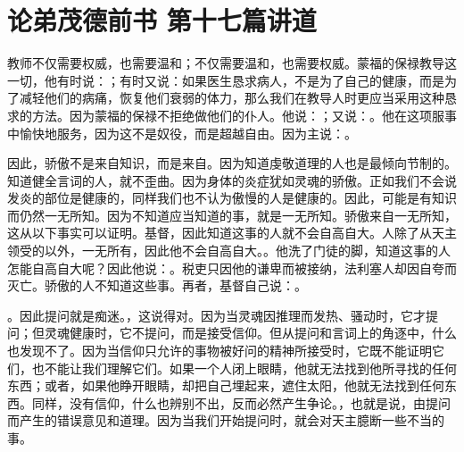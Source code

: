 
\section{论弟茂德前书 第十七篇讲道}

\par

\par

教师不仅需要权威，也需要温和；不仅需要温和，也需要权威。蒙福的保禄教导这一切，他有时说：；有时又说：如果医生恳求病人，不是为了自己的健康，而是为了减轻他们的病痛，恢复他们衰弱的体力，那么我们在教导人时更应当采用这种恳求的方法。因为蒙福的保禄不拒绝做他们的仆人。他说：；又说：。他在这项服事中愉快地服务，因为这不是奴役，而是超越自由。因为主说：。\par

因此，骄傲不是来自知识，而是来自。因为知道虔敬道理的人也是最倾向节制的。知道健全言词的人，就不歪曲。因为身体的炎症犹如灵魂的骄傲。正如我们不会说发炎的部位是健康的，同样我们也不认为傲慢的人是健康的。因此，可能是有知识而仍然一无所知。因为不知道应当知道的事，就是一无所知。骄傲来自一无所知，这从以下事实可以证明。基督，因此知道这事的人就不会自高自大。人除了从天主领受的以外，一无所有，因此他不会自高自大。。他洗了门徒的脚，知道这事的人怎能自高自大呢？因此他说：。税吏只因他的谦卑而被接纳，法利塞人却因自夸而灭亡。骄傲的人不知道这些事。再者，基督自己说：。\par

。因此提问就是痴迷。，这说得对。因为当灵魂因推理而发热、骚动时，它才提问；但灵魂健康时，它不提问，而是接受信仰。但从提问和言词上的角逐中，什么也发现不了。因为当信仰只允许的事物被好问的精神所接受时，它既不能证明它们，也不能让我们理解它们。如果一个人闭上眼睛，他就无法找到他所寻找的任何东西；或者，如果他睁开眼睛，却把自己埋起来，遮住太阳，他就无法找到任何东西。同样，没有信仰，什么也辨别不出，反而必然产生争论。，也就是说，由提问而产生的错误意见和道理。因为当我们开始提问时，就会对天主臆断一些不当的事。\par

